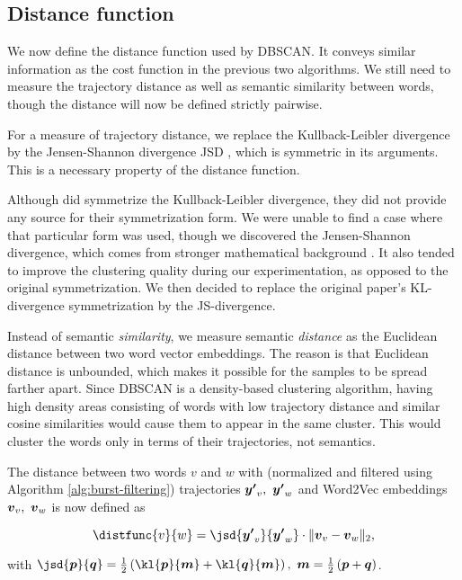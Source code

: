 \subsection{Distance function}
We now define the distance function used by DBSCAN. It conveys similar information as the cost function in the previous two algorithms. We still need to measure the trajectory distance as well as semantic similarity between words, though the distance will now be defined strictly pairwise.

For a measure of trajectory distance, we replace the Kullback-Leibler divergence by the Jensen-Shannon divergence JSD \citep{js-divergence-1}, which is symmetric in its arguments. This is a necessary property of the distance function.

Although \cite{event-detection} did symmetrize the Kullback-Leibler divergence, they did not provide any source for their symmetrization form. We were unable to find a case where that particular form was used, though we discovered the Jensen-Shannon divergence, which comes from stronger mathematical background \citep{js-divergence-1, js-divergence-2}. It also tended to improve the clustering quality during our experimentation, as opposed to the original symmetrization. We then decided to replace the original paper's KL-divergence symmetrization by the JS-divergence.

Instead of semantic \textit{similarity}, we measure semantic \textit{distance} as the Euclidean distance between two word vector embeddings. The reason is that Euclidean distance is unbounded, which makes it possible for the samples to be spread farther apart. Since DBSCAN is a density-based clustering algorithm, having high density areas consisting of words with low trajectory distance and similar cosine similarities would cause them to appear in the same cluster. This would cluster the words only in terms of their trajectories, not semantics.

The distance between two words $v$ and $w$ with (normalized and filtered using Algorithm \ref{alg:burst-filtering}) trajectories $\vect{\trajn}_{v},\ \vect{\trajn}_{w}$ and Word2Vec embeddings $\embed_{v},\ \embed_{w}$ is now defined as

\begin{equation}
	\distfunc{v}{w} = \jsd{\vect{\trajn}_{v}}{\vect{\trajn}_{w}} \cdot \| \embed_{v} - \embed_{w}\|_{2},
\end{equation}

with $\jsd{\vect{p}}{\vect{q}} = \frac{1}{2} \left( \kl{\vect{p}}{\vect{m}} + \kl{\vect{q}}{\vect{m}} \right) ,\ \vect{m} = \frac{1}{2} \left( \vect{p} + \vect{q} \right)$.


